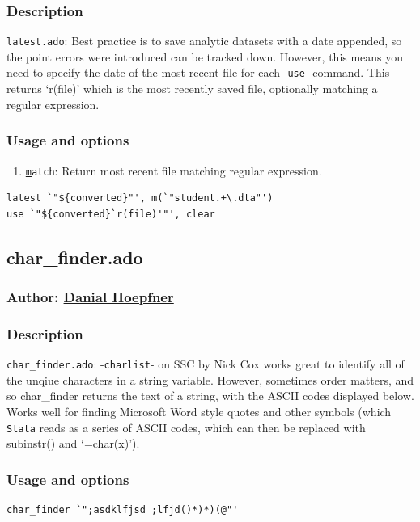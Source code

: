 {\subsubsection{Description}
\texttt{latest.ado}: Best practice is to save analytic datasets with a date appended, so the point errors were introduced can be tracked down. However, this means you need to specify the date of the most recent file for each -\texttt{use}- command. This returns `r(file)' which is the most recently saved file, optionally matching a regular expression.
\subsubsection{Usage and options}
\begin{enumerate}
\item \texttt{\underline{m}atch}: Return most recent file matching regular expression.
\end{enumerate}

\begin{lstlisting}
latest `"${converted}"', m(`"student.+\.dta"')
use `"${converted}`r(file)'"', clear
\end{lstlisting}


\subsection{char\_finder.ado}
\subsubsection{Author: \href{mailto:dhoepfner@gibsonconsult.com}{Danial Hoepfner}}
\subsubsection{Description}
\texttt{char\_finder.ado}: -\texttt{charlist}- on SSC by Nick Cox works great to identify all of the unqiue characters in a string variable. However, sometimes order matters, and so char\_finder returns the text of a string, with the ASCII codes displayed below. Works well for finding Microsoft Word style quotes and other symbols (which \texttt{Stata} reads as a series of ASCII codes, which can then be replaced with subinstr() and `=char(x)').
\subsubsection{Usage and options}
\begin{lstlisting}
char_finder `";asdklfjsd ;lfjd()*)*)(@"'
\end{lstlisting}


}
